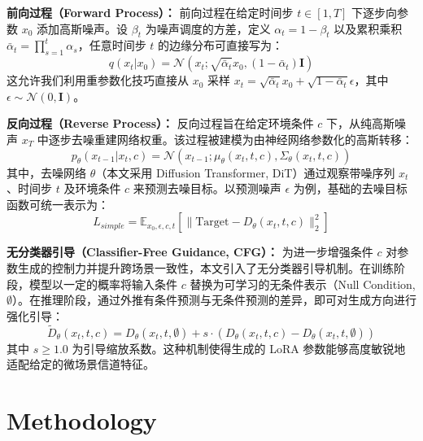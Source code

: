 \documentclass[12pt,a4paper]{article}
\begin{document}
\textbf{前向过程（Forward Process）：} 前向过程在给定时间步 $t \in [1, T]$ 下逐步向参数 $x_0$ 添加高斯噪声。设 $\beta_t$ 为噪声调度的方差，定义 $\alpha_t = 1 - \beta_t$ 以及累积乘积 $\bar{\alpha}_t = \prod_{s=1}^t \alpha_s$，任意时间步 $t$ 的边缘分布可直接写为：
\begin{equation}
q(x_t | x_0) = \mathcal{N}(x_t; \sqrt{\bar{\alpha}_t} x_0, (1 - \bar{\alpha}_t)\mathbf{I})
\end{equation}
这允许我们利用重参数化技巧直接从 $x_0$ 采样 $x_t = \sqrt{\bar{\alpha}_t} x_0 + \sqrt{1 - \bar{\alpha}_t}\epsilon$，其中 $\epsilon \sim \mathcal{N}(0, \mathbf{I})$。

\textbf{反向过程（Reverse Process）：} 反向过程旨在给定环境条件 $c$ 下，从纯高斯噪声 $x_T$ 中逐步去噪重建网络权重。该过程被建模为由神经网络参数化的高斯转移：
\begin{equation}
p_\theta(x_{t-1} | x_t, c) = \mathcal{N}(x_{t-1}; \mu_\theta(x_t, t, c), \Sigma_\theta(x_t, t, c))
\end{equation}
其中，去噪网络 $\theta$（本文采用 Diffusion Transformer, DiT）通过观察带噪序列 $x_t$、时间步 $t$ 及环境条件 $c$ 来预测去噪目标。以预测噪声 $\epsilon$ 为例，基础的去噪目标函数可统一表示为：
\begin{equation}
L_{simple} = \mathbb{E}_{x_0, \epsilon, c, t} \left[ \| \text{Target} - D_\theta(x_t, t, c) \|_2^2 \right]
\end{equation}

\textbf{无分类器引导（Classifier-Free Guidance, CFG）：}
为进一步增强条件 $c$ 对参数生成的控制力并提升跨场景一致性，本文引入了无分类器引导机制。在训练阶段，模型以一定的概率将输入条件 $c$ 替换为可学习的无条件表示（Null Condition, $\emptyset$）。在推理阶段，通过外推有条件预测与无条件预测的差异，即可对生成方向进行强化引导：
\begin{equation}
\tilde{D}_\theta(x_t, t, c) = D_\theta(x_t, t, \emptyset) + s \cdot \left( D_\theta(x_t, t, c) - D_\theta(x_t, t, \emptyset) \right)
\end{equation}
其中 $s \ge 1.0$ 为引导缩放系数。这种机制使得生成的 LoRA 参数能够高度敏锐地适配给定的微场景信道特征。


\section{Methodology}
\label{sec:method}
\end{document}
